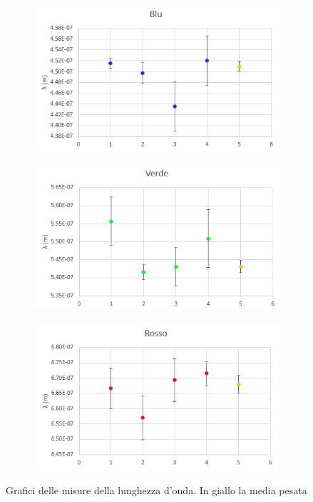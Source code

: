 \documentclass{article}
\begin{document}
\begin{figure}[h]
  \centering
  \begin{subfigure}[b]{0.3\linewidth}
    \includegraphics[width=\linewidth]{IM blu_lambda_1}
  \end{subfigure}
  \begin{subfigure}[b]{0.3\linewidth}
    \includegraphics[width=\linewidth]{IM verde_lambda_1}
  \end{subfigure}
  \begin{subfigure}[b]{0.3\linewidth}
    \includegraphics[width=\linewidth]{IM rosso_lambda_1}
  \end{subfigure}
  \caption{Grafici delle misure della lunghezza d'onda. In giallo la media pesata}
\end{figure}
\end{document}
